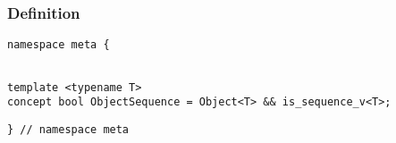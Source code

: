 
\subsubsection{Definition}

\begin{verbatim}
namespace meta {
\end{verbatim}
\begin{verbatim}

template <typename T>
concept bool ObjectSequence = Object<T> && is_sequence_v<T>;

\end{verbatim}
\begin{verbatim}
} // namespace meta
\end{verbatim}

